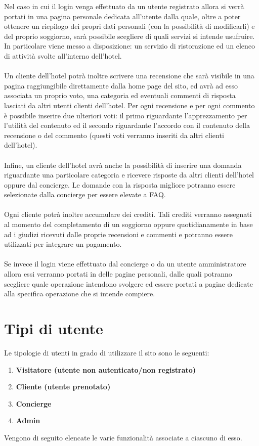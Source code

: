 \documentclass [a4paper, 12pt]{book}
\begin{document}
Nel caso in cui il login venga effettuato da un utente registrato allora si verrà portati in una pagina personale dedicata all'utente dalla quale, oltre a poter ottenere un riepilogo dei propri dati personali (con la possibilità di modificarli) e del proprio soggiorno, sarà possibile scegliere di quali servizi si intende usufruire. In particolare viene messo a disposizione: un servizio di ristorazione ed un elenco di attività svolte all'interno dell'hotel. \\\\Un cliente dell'hotel potrà inoltre scrivere una recensione che sarà visibile in una pagina raggiungibile direttamente dalla home page del sito, ed avrà ad esso associata un proprio voto, una categoria ed eventuali commenti di risposta lasciati da altri utenti clienti dell'hotel. Per ogni recensione e per ogni commento è possibile inserire due ulteriori voti: il primo riguardante l'apprezzamento per l'utilità del contenuto ed il secondo riguardante l'accordo con il contenuto della recensione o del commento (questi voti verranno inseriti da altri clienti dell'hotel).\\\\
Infine, un cliente dell'hotel avrà anche la possibilità di inserire una domanda riguardante una particolare categoria e ricevere risposte da altri clienti dell'hotel oppure dal concierge. Le domande con la risposta migliore potranno essere selezionate dalla concierge per essere elevate a FAQ.  \\\\
Ogni cliente potrà inoltre accumulare dei crediti. Tali crediti verranno assegnati al momento del completamento di un soggiorno oppure quotidianamente in base ad i giudizi ricevuti dalle proprie recensioni e commenti e potranno essere utilizzati per integrare un pagamento.\\\\
Se invece il login viene effettuato dal concierge o da un utente amministratore allora essi verranno portati in delle pagine personali, dalle quali potranno scegliere quale operazione intendono svolgere ed essere portati a pagine dedicate alla specifica operazione che si intende compiere.

\medskip

\section{Tipi di utente}
Le tipologie di utenti in grado di utilizzare il sito sono le seguenti:
\begin{enumerate}
\item \textbf{Visitatore (utente non autenticato/non registrato)}
\item \textbf{Cliente (utente prenotato)}
\item \textbf{Concierge}
\item \textbf{Admin}
\end{enumerate}
Vengono di seguito elencate le varie funzionalità associate a ciascuno di esso.
\end{document}
